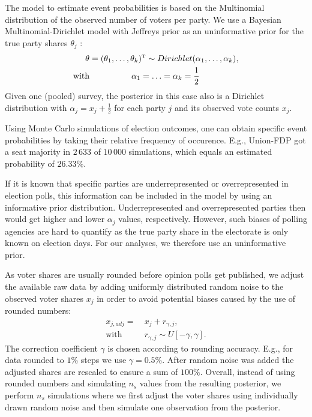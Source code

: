 \documentclass[smallcondensed]{svjour3}     %
\newcommand{\T}{\mathrm{\scriptscriptstyle T}}
\begin{document}
The model to estimate event probabilities is based on the Multinomial distribution of the observed
number of voters per party. We use a Bayesian Multinomial-Dirichlet model
with Jeffreys prior as an uninformative prior for the true party shares
$\theta_j$ \citep{gelman_2013}:
\begin{equation}
\begin{aligned}
\boldmath{\theta} &= (\theta_1,\ldots,\theta_k)^\T \sim Dirichlet(\alpha_1,\ldots,\alpha_k), \\
\text{with} &\ \ \ \ \ \ \ \ \ \ \ \ \ \ \ \alpha_1 = \ldots = \alpha_k = \frac{1}{2}
\end{aligned}
\end{equation}
Given one (pooled) survey, the posterior in this case also is a Dirichlet distribution
with $\alpha_j = x_j + \frac{1}{2}$ for each party $j$ and its observed
vote counts $x_j$.

Using Monte Carlo simulations of election outcomes, one can obtain
specific event probabilities by taking their relative frequency of
occurence. E.g., Union-FDP got a seat majority
in $2\,633$ of $10\,000$ simulations, which equals an estimated 
probability of $26.33\%$.

If it is known that specific parties are underrepresented or
overrepresented in election polls, this information
can be included in the model by using an informative prior distribution.
Underrepresented and overrepresented parties then would get higher and lower
$\alpha_j$ values, respectively.
However, such biases of polling agencies are hard to quantify
as the true party share in the electorate is only known on election days.
For our analyses, we therefore use an uninformative prior.

As voter shares are usually rounded before opinion polls get published,
we adjust the available raw data
by adding uniformly distributed random noise to the
observed voter shares $x_j$ in order to avoid potential biases caused 
by the use of rounded numbers:
\begin{equation}
\begin{aligned}
x_{j,adj} = \ &x_j + r_{\gamma,j}, \\
\text{with} \ \ \ \ \ &r_{\gamma,j} \sim U[-\gamma,\gamma].
\end{aligned}
\end{equation}
The correction coefficient $\gamma$ is chosen according to
rounding accuracy.
E.g., for data rounded to $1\%$ steps we use $\gamma = 0.5\%$.
After random noise was added the adjusted shares are rescaled to
ensure a sum of $100\%$. Overall, instead of using rounded numbers
and simulating $n_s$ values from the resulting posterior, we perform 
$n_s$ simulations where
we first adjust the voter shares using individually drawn random noise
and then simulate one observation from the posterior.
\end{document}
